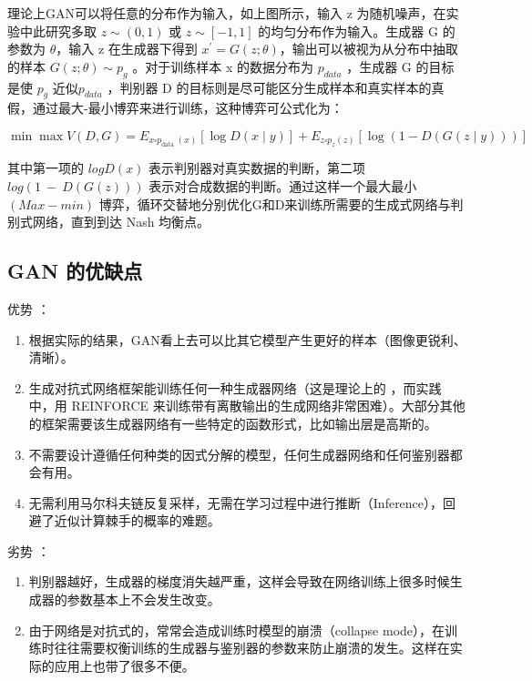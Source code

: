 理论上GAN可以将任意的分布作为输入，如上图所示，输入 z 为随机噪声，在实验中此研究多取 $z∼(0,1)$ 或 $z∼[-1,1]$ 的均匀分布作为输入。生成器 G 的参数为 $\theta$，输入 z 在生成器下得到 $x^\prime=G(z;\theta)$，输出可以被视为从分布中抽取的样本 $G(z; \theta)∼ p_{g}$ 。对于训练样本 x 的数据分布为 $p_{data}$ ，生成器 G 的目标是使 $p_{g}$ 近似$p_{data}$ ，判别器 D 的目标则是尽可能区分生成样本和真实样本的真假，通过最大-最小博弈来进行训练，这种博弈可公式化为：

\begin{equation}
\min \max V(D, G)=E_{x \square p_{\text {data }}(x)}[\log D(x \mid y)]+E_{z \square p_{z}(z)}[\log (1-D(G(z \mid y)))]
\end{equation}


其中第一项的 $logD(x)$ 表示判别器对真实数据的判断，第二项 $log(1\ -\ D(G(z)))$ 表示对合成数据的判断。通过这样一个最大最小 $(Max-min)$ 博弈，循环交替地分别优化G和D来训练所需要的生成式网络与判别式网络，直到到达 Nash 均衡点。

\subsection{GAN 的优缺点}

优势 ：

\begin{enumerate}
 \item 根据实际的结果，GAN看上去可以比其它模型产生更好的样本（图像更锐利、清晰）。
 \item 生成对抗式网络框架能训练任何一种生成器网络（这是理论上的 ，而实践中，用 REINFORCE 来训练带有离散输出的生成网络非常困难）。大部分其他的框架需要该生成器网络有一些特定的函数形式，比如输出层是高斯的。
 \item 不需要设计遵循任何种类的因式分解的模型，任何生成器网络和任何鉴别器都会有用。
 \item 无需利用马尔科夫链反复采样，无需在学习过程中进行推断（Inference），回避了近似计算棘手的概率的难题。
\end{enumerate}

劣势 ：

\begin{enumerate}
 \item 判别器越好，生成器的梯度消失越严重，这样会导致在网络训练上很多时候生成器的参数基本上不会发生改变。
 \item 由于网络是对抗式的，常常会造成训练时模型的崩溃（collapse mode），在训练时往往需要权衡训练的生成器与鉴别器的参数来防止崩溃的发生。这样在实际的应用上也带了很多不便。
\end{enumerate}

